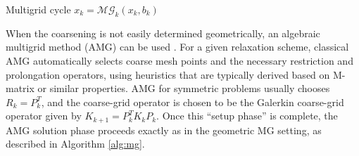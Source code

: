 \begin{algorithm}
  \caption{Multigrid cycle $x_k = \mathcal{MG}_k(x_k,b_k)$}
  \label{alg:mg}
  \begin{algorithmic}
  \ELSE
  \ENDIF
  \end{algorithmic}
\end{algorithm}

When the coarsening is not easily determined geometrically, an
algebraic multigrid method (AMG) can be
used \cite{ABrandt_SFMcCormick_JWRuge_1984a, JWRuge_KStuben_1987a,
KStuben_2001a}. For a given relaxation scheme, classical AMG
automatically selects coarse mesh points and the necessary restriction
and prolongation operators, using heuristics that are
typically derived based on M-matrix or similar properties. AMG for
symmetric problems usually chooses $R_k = P_k^T$, and the coarse-grid
operator is chosen to be the Galerkin coarse-grid operator given by
$K_{k+1} = P_k^T K_k P_k$.  Once this ``setup phase'' is complete, the
AMG solution phase proceeds exactly as in the geometric MG setting, as
described in Algorithm \ref{alg:mg}.


